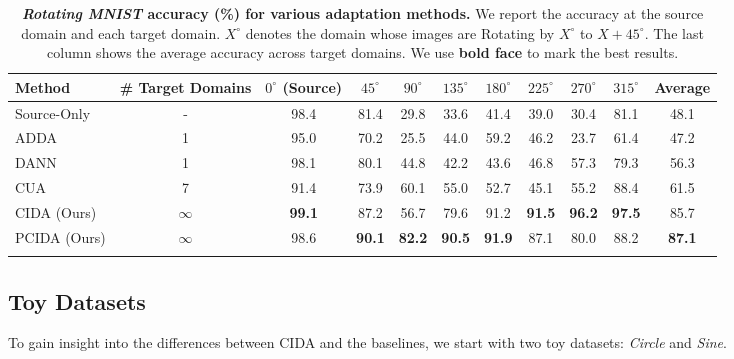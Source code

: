 \documentclass{article}
\begin{document}
\begin{table*}[!t]
\begin{footnotesize}
\vskip -0.3cm
\begin{center}
\caption{ \textbf{\emph{Rotating MNIST} accuracy (\%) for various adaptation methods.} We report the accuracy at the source domain and each target domain. $X^\circ$ denotes the domain whose images are Rotating by $X^\circ$ to $X+45^\circ$. The last column shows the average accuracy across target domains. We use \textbf{bold face} to mark the best results.}
\label{tab:mnist}
\vspace{1mm}
\begin{tabular}{lcccccccccc}
\hline
Method & \# Target Domains & $0^\circ$ (Source) & $45^\circ$ & $90^\circ$ & $135^\circ$ & $180^\circ$ & $225^\circ$ & $270^\circ$ & $315^\circ$ & Average \\
\hline
Source-Only & - & 98.4 & 81.4 & 29.8 & 33.6 & 41.4 & 39.0 & 30.4 & 81.1 & 48.1 \\
ADDA        & 1 & 95.0 & 70.2 & 25.5 & 44.0 & 59.2 & 46.2 & 23.7 & 61.4 & 47.2 \\
DANN        & 1 & 98.1 & 80.1 & 44.8 & 42.2 & 43.6 & 46.8 & 57.3 & 79.3 & 56.3 \\
CUA         & 7 & 91.4 & 73.9 & 60.1 & 55.0 & 52.7 & 45.1 & 55.2 & 88.4 & 61.5 \\
CIDA (Ours) & $\infty$ & \textbf{99.1} & 87.2 & 56.7 & 79.6 & 91.2 & \textbf{91.5} & \textbf{96.2} & \textbf{97.5} & 85.7 \\
PCIDA (Ours) & $\infty$ & 98.6 & \textbf{90.1} & \textbf{82.2} & \textbf{90.5} & \textbf{91.9} & 87.1 & 80.0 & 88.2 & \textbf{87.1} \\
\hline
 \vspace{-10mm}
\end{tabular}
\end{center}
\end{footnotesize}
\end{table*}

\subsection{Toy Datasets}
To gain insight into the differences between CIDA and the baselines, we start with two toy datasets: \emph{Circle} and \emph{Sine}.
\end{document}
